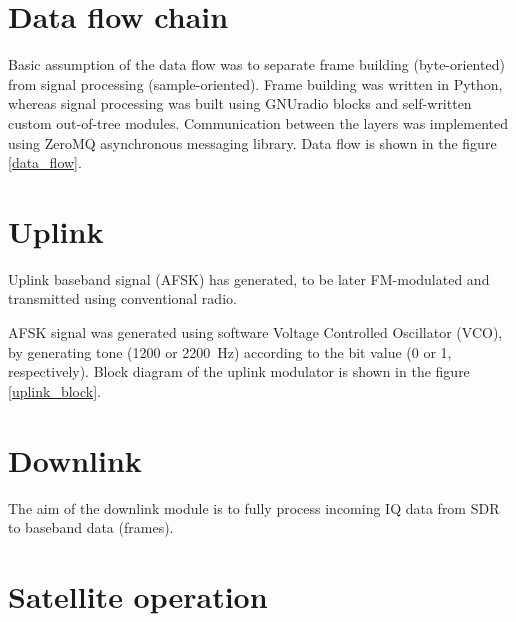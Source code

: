 \section{Data flow chain}
Basic assumption of the data flow was to separate frame building (byte-oriented) from signal processing (sample-oriented). Frame building was written in Python, whereas signal processing was built using GNUradio blocks and self-written custom out-of-tree modules. Communication between the layers was implemented using ZeroMQ asynchronous messaging library. Data flow is shown in the figure \ref{data_flow}.



\section{Uplink}
Uplink baseband signal (AFSK) has generated, to be later FM-modulated and transmitted using conventional radio.

AFSK signal was generated using software Voltage Controlled Oscillator (VCO), by generating tone (\si{1200} or \SI{2200}{\hertz}) according to the bit value (\si{0} or \si{1}, respectively).  Block diagram of the uplink modulator is shown in the figure \ref{uplink_block}.


\section{Downlink}
The aim of the downlink module is to fully process incoming IQ data from SDR to baseband data (frames).




\section{Satellite operation}

